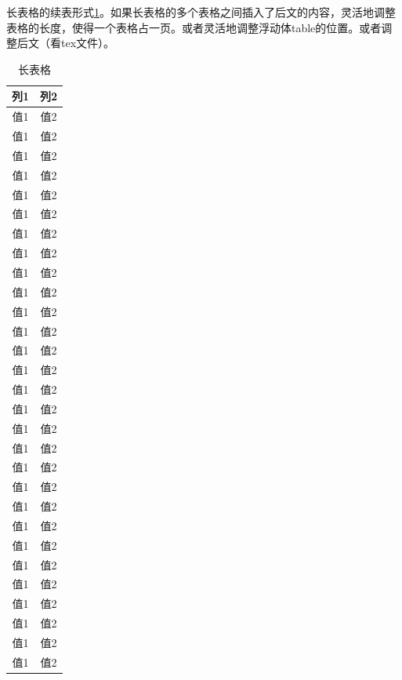 \documentclass{csuthesis}
\begin{document}
    长表格的续表形式\ref{tab:long_table1}。如果长表格的多个表格之间插入了后文的内容，灵活地调整表格的长度，使得一个表格占一页。或者灵活地调整浮动体table的位置。或者调整后文（看tex文件）。
    \begin{table}[!t]
        \centering
        \caption{长表格}
        \label{tab:long_table1}
        \begin{tabular}{c c}
            \toprule[1.5bp]
            列1 & 列2 \\
            \midrule[0.75bp]
            值1 & 值2 \\
            值1 & 值2 \\
            值1 & 值2 \\
            值1 & 值2 \\
            值1 & 值2 \\
            值1 & 值2 \\
            值1 & 值2 \\
            值1 & 值2 \\
            值1 & 值2 \\
            值1 & 值2 \\
            值1 & 值2 \\
            值1 & 值2 \\
            值1 & 值2 \\
            值1 & 值2 \\
            值1 & 值2 \\
            值1 & 值2 \\
            值1 & 值2 \\
            值1 & 值2 \\
            值1 & 值2 \\
            值1 & 值2 \\
            值1 & 值2 \\
            值1 & 值2 \\
            值1 & 值2 \\
            值1 & 值2 \\
            值1 & 值2 \\
            值1 & 值2 \\
            值1 & 值2 \\
            值1 & 值2 \\
            值1 & 值2 \\
            \bottomrule[1.5bp]
        \end{tabular}
    \end{table}

\end{document}
